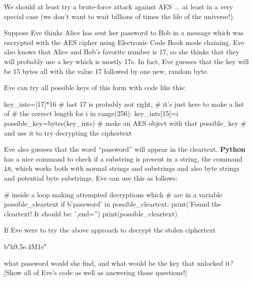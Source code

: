 \documentclass[12pt,letterpaper]{amsbook}
\theoremstyle{definition}
\theoremstyle{remark}
\numberwithin{figure}{section}
\numberwithin{exercise}{chapter}
\numberwithin{section}{chapter}
\numberwithin{equation}{section}
\numberwithin{table}{subsection}
\newcommand{\code}[1]{\colorbox{lg}{\texttt{#1}}}
\newcommand{\Python}{{\textbf{\ix{Python}}}}
\newcommand{\ix}[1]{{#1}\index{#1}}
\begin{document}
\vskip2mm
\begin{CTtcb}[label=ct:bruteforceAESattack]{}{}
We should at least try a \ix{brute-force attack} against
AES ... at least in a very special case (we don't want to wait billions of times
the life of the universe!).

Suppose Eve thinks Alice has sent her password to Bob in a message which was
encrypted with the AES cipher using Electronic Code
Book mode chaining.  Eve
also knows that Alice and Bob's favorite number is 17, so she thinks that they
will probably use a key which is mostly 17s.  In fact, Eve guesses that the key
will be 15 bytes all with the value 17 followed by one new, random byte.

Eve can try all possible keys of this form with code like this:\\
\begin{codedisp}
  key_ints=[17]*16  # last 17 is probably not right,
                    # it's just here to make a list of
                    # the correct length
  for i in range(256):
    key_ints[15]=i
    possible_key=bytes(key_ints)
    # make an AES object with that possible_key
    # and use it to try decrypting the ciphertext
\end{codedisp}

Eve also guesses that the word ``password'' will appear in the cleartext.
{\Python} has a nice command to check if a substring is present in a string,
the command \code{in}, which works both with normal strings and substrings and
also byte strings and potential byte substrings.  Eve can use this as follows:\\
\begin{codedisp}
  # inside a loop making attempted decryptions which
  # are in a variable possible_cleartext
  if b'password' in possible_cleartext:
    print('Found the cleartext!  It should be: ',end='')
    print(possible_cleartext)
\end{codedisp}

\vskip3mm
If Eve were to try the above approach to decrypt the stolen ciphertext\\
\begin{codedisp}
b"h9,\x5e.\xab\xf4M\x1e\xcea\r"
\end{codedisp}

what password
would she find, and what would be the key that unlocked it?  [Show all of
Eve's code as well as answering those questions!]
\end{CTtcb}
\end{document}
